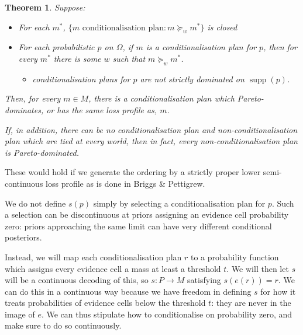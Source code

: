\documentclass[11pt]{article}
\newtheorem{theorem}{Theorem}[section]
\theoremstyle{definition}
\theoremstyle{remark}
\newcommand{\supp}{\operatorname{supp}}
\begin{document}
\begin{theorem}
	Suppose:
	\begin{itemize}
		\item For each $m^*$, $\{m \text{ conditionalisation plan} : m\succeq_w m^*\}$ is closed
		\item For each probabilistic $p$ on $\Omega$, if $m$ is a conditionalisation plan for $p$, then for every $m^*$ there is some $w$ such that $m\succeq_w m^*$. 
		\begin{itemize}
			\item conditionalisation plans for $p$ are not strictly dominated on $\supp(p)$. 
		\end{itemize}
	\end{itemize}
	
	Then, for every $m\in M$, there is a conditionalisation plan which Pareto-dominates, or has the same loss profile as, $m$. 
	
	If, in addition, there can be no conditionalisation plan and non-conditionalisation plan which are tied at every world, then in fact, every non-conditionalisation plan is Pareto-dominated. 
\end{theorem}
These would hold if we generate the ordering by a strictly proper lower semi-continuous loss profile as is done in Briggs \& Pettigrew. 

We do not define $s(p)$ simply by selecting a
conditionalisation plan for $p$. Such a selection
can be discontinuous at priors assigning an evidence
cell probability zero: priors approaching the same
limit can have very different conditional posteriors.

Instead, we will map each conditionalisation plan $r$ to a probability function which assigns every evidence cell a mass at least a threshold $t$. We will then let $s$ will be a continuous decoding of this, so $s\colon P\to M$ satisfying $s(e(r))=r$. We can do this in a continuous way because we have freedom in defining $s$ for how it treats probabilities of evidence cells below the threshold $t$: they are never in the image of $e$. We can thus stipulate how to conditionalise on probability zero, and make sure to do so continuously. 
\end{document}
